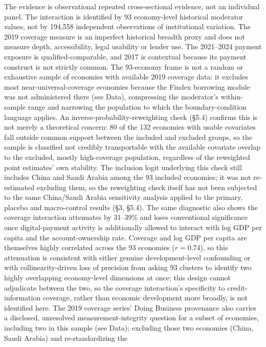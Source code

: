 The evidence is observational repeated cross-sectional evidence, not an individual panel.
The interaction is identified by 93 economy-level historical moderator values, not by
194,558 independent observations of institutional variation. The 2019 coverage measure is
an imperfect historical breadth proxy and does not measure depth, accessibility, legal
usability or lender use. The 2021--2024 payment exposure is qualified-comparable, and 2017
is contextual because its payment construct is not strictly common. The 93-economy frame
is not a random or exhaustive sample of economies with available 2019 coverage data: it
excludes most near-universal-coverage economies because the Findex borrowing module was
not administered there (see Data), compressing the moderator's within-sample range and
narrowing the population to which the boundary-condition language applies. An
inverse-probability-reweighting check (\S5.4) confirms this is not merely a theoretical
concern: 80 of the 132 economies with usable covariates fall outside common support between
the included and excluded groups, so the sample is classified not credibly transportable
with the available covariate overlap to the excluded, mostly high-coverage population,
regardless of the reweighted point estimates' own stability. The inclusion logit underlying
this check still includes China and Saudi Arabia among the 93 included economies; it was
not re-estimated excluding them, so the reweighting check itself has not been subjected to
the same China/Saudi Arabia sensitivity analysis applied to the primary, placebo and
macro-control results (\S3, \S5.4). The same diagnostic also shows the coverage interaction attenuates by 31--39\%
and loses conventional significance once digital-payment activity is additionally allowed
to interact with log GDP per capita and the account-ownership rate. Coverage and log GDP
per capita are themselves highly correlated across the 93 economies ($r=0.74$), so this
attenuation is consistent with either genuine development-level confounding or with
collinearity-driven loss of precision from asking 93 clusters to identify two highly
overlapping economy-level dimensions at once; this design cannot adjudicate between the two,
so the coverage interaction's specificity to credit-information coverage, rather than
economic development more broadly, is not identified here. The 2019
coverage series' Doing Business provenance also carries a disclosed, unresolved
measurement-integrity question for a subset of economies, including two in this sample
(see Data); excluding those two economies (China, Saudi Arabia) and re-standardizing the
